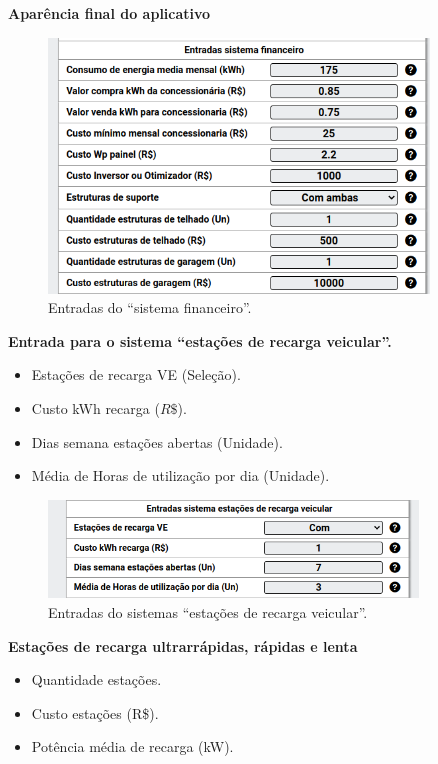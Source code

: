 \textbf{Aparência final do aplicativo}

\begin{figure}[H]
    \centering
    \includegraphics[width=0.9\textwidth]{./Figuras/ret_fin_1.png}
    \caption{Entradas do ``sistema financeiro''.}
   \label{fig:ret_fin_1}
\end{figure}

\newpage
\textbf{Entrada para o sistema ``estações de recarga veicular''.}

\begin{itemize}
   \item Estações de recarga VE (Seleção).
   \item Custo kWh recarga ($R\$$).
   \item Dias semana estações abertas (Unidade).
   \item Média de Horas de utilização por dia (Unidade).
\end{itemize}

\begin{figure}[H]
    \centering
    \includegraphics[width=0.875\textwidth]{./Figuras/ret_fin_2.png}
    \caption{Entradas do sistemas ``estações de recarga veicular''.}
   \label{fig:ret_fin_2}
\end{figure}

\textbf{Estações de recarga ultrarrápidas, rápidas e lenta}

\begin{itemize}
   \item Quantidade estações.
   \item Custo estações (R\$).
   \item Potência média de recarga (kW).
\end{itemize}

